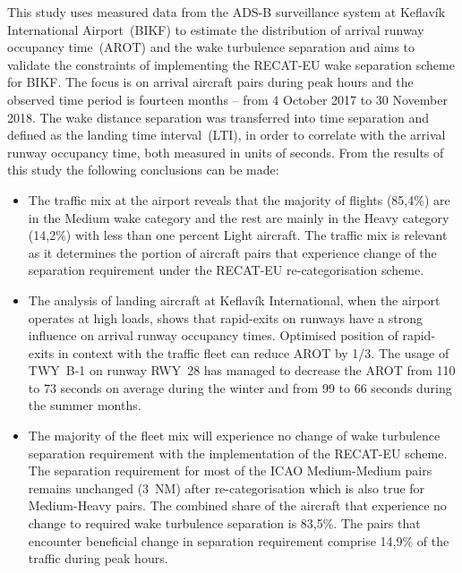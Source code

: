 This study uses measured data from the ADS-B surveillance system at Keflavík International Airport~(BIKF) to estimate the distribution of arrival runway occupancy time~(AROT) and the wake turbulence separation and aims to validate the constraints of implementing the RECAT-EU wake  separation scheme for BIKF. The focus is on arrival aircraft pairs during peak hours and the observed time period is fourteen months -- from 4 October 2017 to 30 November 2018. The wake distance separation was transferred into time separation and defined as the landing time interval~(LTI), in order to correlate with the arrival runway occupancy time, both measured in units of seconds.
From the results of this study the following conclusions can be made:
\begin{itemize}

    \item The traffic mix at the airport reveals that the majority of flights (85,4\%) are in the Medium wake category and the rest are mainly in the Heavy category (14,2\%) with less than one percent Light aircraft. The traffic mix is relevant as it determines the portion of aircraft pairs that experience change of the separation requirement under the RECAT-EU re-categorisation scheme.

    \item The analysis of landing aircraft at Keflavík International, when the airport operates at high loads, shows that rapid-exits on runways have a strong influence on arrival runway occupancy times. Optimised position of rapid-exits in context with the traffic fleet can reduce AROT by 1/3. The usage of TWY~B-1 on runway RWY~28 has managed to decrease the AROT from 110 to 73 seconds on average during the winter and from 99 to 66 seconds during the summer months.
    
    \item The majority of the fleet mix will experience no change of wake turbulence separation requirement with the implementation of the RECAT-EU scheme. The separation requirement for most of the ICAO Medium-Medium pairs remains unchanged (3~NM) after re-categorisation which is also true for Medium-Heavy pairs. The combined share of the aircraft that experience no change to required wake turbulence separation is 83,5\%. The pairs that encounter beneficial change in separation requirement comprise 14,9\% of the traffic during peak hours.
    

\end{itemize}
